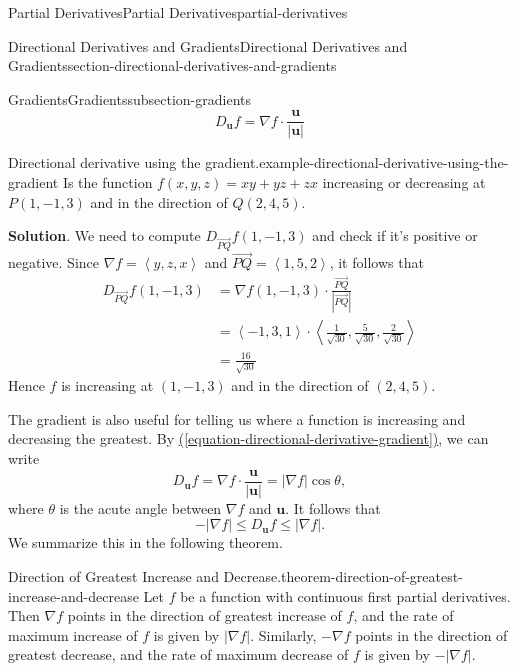 \documentclass[oneside,10pt,]{book}
\numberwithin{equation}{section}
\newcommand{\vv}[1]{\mathbf{#1}}
\newcommand{\grad}{\nabla}
\newcommand{\dotprod}[1]{\left\langle #1 \right\rangle}
\begin{document}
\begin{chapterptx}{Partial Derivatives}{}{Partial Derivatives}{}{}{partial-derivatives}
\begin{sectionptx}{Directional Derivatives and Gradients}{}{Directional Derivatives and Gradients}{}{}{section-directional-derivatives-and-gradients}
\begin{subsectionptx}{Gradients}{}{Gradients}{}{}{subsection-gradients}
\begin{equation}
D_{\vv{u}}f = \grad f\cdot \frac{\vv{u}}{|\vv{u}|}\label{equation-directional-derivative-gradient}
\end{equation}
%
\begin{example}{Directional derivative using the gradient.}{example-directional-derivative-using-the-gradient}%
\hypertarget{p-1412}{}%
Is the function \(f(x,y,z) = xy + yz + zx\) increasing or decreasing at \(P(1,-1,3)\) and in the direction of \(Q(2,4,5)\).%
\par\smallskip%
\noindent\textbf{Solution}.\hypertarget{solution-229}{}\quad%
\hypertarget{p-1413}{}%
We need to compute \(D_{\vec{PQ}}f(1,-1,3)\) and check if it's positive or negative. Since \(\grad f = \dotprod{y, z, x}\) and \(\vec{PQ} = \dotprod{1,5,2}\), it follows that%
\begin{align*}
D_{\vec{PQ}}f(1,-1,3) & = \grad f (1,-1,3)\cdot\frac{\vec{PQ}}{|\vec{PQ}|} \\
& = \dotprod{-1, 3, 1}\cdot\dotprod{\frac{1}{\sqrt{30}}, \frac{5}{\sqrt{30}}, \frac{2}{\sqrt{30}}} \\
& = \frac{16}{\sqrt{30}} 
\end{align*}
Hence \(f\) is increasing at \((1,-1,3)\) and in the direction of \((2,4,5)\).%
\end{example}
\hypertarget{p-1414}{}%
The gradient is also useful for telling us where a function is increasing and decreasing the greatest. By \hyperref[equation-directional-derivative-gradient]{(\ref{equation-directional-derivative-gradient})}, we can write%
\begin{equation*}
D_{\vv{u}}f = \grad f\cdot\frac{\vv{u}}{|\vv{u}|} = |\grad f| \cos\theta,
\end{equation*}
where \(\theta\) is the acute angle between \(\grad f\) and \(\vv{u}\). It follows that%
\begin{equation*}
-|\grad f| \leq D_{\vv{u}}f \leq |\grad f|.
\end{equation*}
We summarize this in the following theorem.%
\begin{theorem}{Direction of Greatest Increase and Decrease.}{}{theorem-direction-of-greatest-increase-and-decrease}%
\hypertarget{p-1415}{}%
Let \(f\) be a function with continuous first partial derivatives. Then \(\grad f\) points in the direction of greatest increase of \(f\), and the rate of maximum increase of \(f\) is given by \(|\grad f|\). Similarly, \(-\grad f\) points in the direction of greatest decrease, and the rate of maximum decrease of \(f\) is given by \(-|\grad f|\).%

\end{theorem}
\end{subsectionptx}
\end{sectionptx}
\end{chapterptx}
\end{document}
